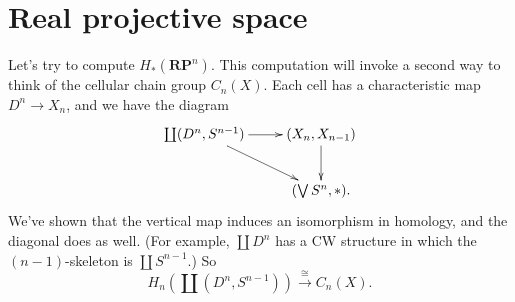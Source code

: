 \section{Real projective space}


Let's try to compute $H_\ast(\mathbf{RP}^n)$. This computation will invoke a 
second way to think of the cellular chain group $C_n(X)$. Each cell has a 
characteristic map $D^n\to X_n$, and we have the diagram
\[
\xymatrix{
\coprod(D^n,S^{n-1}) \ar[r] \ar[dr] & (X_n,X_{n-1}) \ar[d] \\
& (\bigvee S^n,\ast).
}\]
We've shown that the vertical map induces an isomorphism in homology, and
the diagonal does as well. (For example, $\coprod D^n$ has a CW structure 
in which the $(n-1)$-skeleton is $\coprod S^{n-1}$.) So 
\[
H_n(\textstyle{\coprod}(D^n,S^{n-1}))\xrightarrow{\cong}C_n(X).
\]
 
